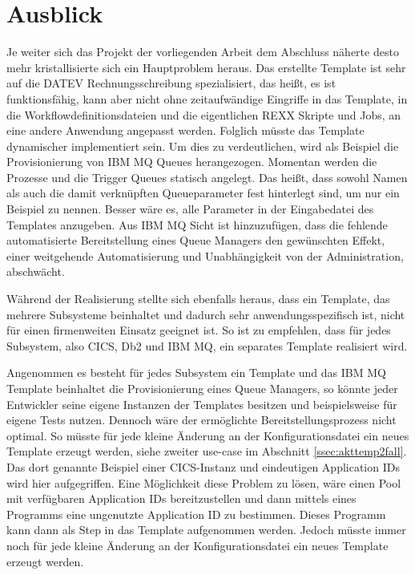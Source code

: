 \chapter{Ausblick}\label{ch:ausblick}
Je weiter sich das Projekt der vorliegenden Arbeit dem Abschluss näherte desto mehr kristallisierte sich ein Hauptproblem heraus.
Das erstellte Template ist sehr auf die DATEV Rechnungsschreibung spezialisiert, das heißt, es ist funktionsfähig, kann aber nicht ohne zeitaufwändige Eingriffe in das Template, in die Workflowdefinitionsdateien und die eigentlichen REXX Skripte und Jobs, an eine andere Anwendung angepasst werden. 
Folglich müsste das Template dynamischer implementiert sein.
Um dies zu verdeutlichen, wird als Beispiel die Provisionierung von IBM MQ Queues herangezogen.
Momentan werden die Prozesse und die Trigger Queues  statisch angelegt.
Das heißt, dass sowohl Namen als auch die damit verknüpften Queueparameter fest hinterlegt sind, um nur ein Beispiel zu nennen.
Besser wäre es, alle Parameter in der Eingabedatei des Templates anzugeben.
Aus IBM MQ Sicht ist hinzuzufügen, dass die fehlende automatisierte Bereitstellung eines Queue Managers den gewünschten Effekt, einer weitgehende Automatisierung und Unabhängigkeit von der Administration, abschwächt.

Während der Realisierung stellte sich ebenfalls heraus, dass ein Template, das mehrere Subsysteme beinhaltet und dadurch sehr anwendungsspezifisch ist, nicht für einen firmenweiten Einsatz geeignet ist.
So ist zu empfehlen, dass für jedes Subsystem, also CICS, Db2 und IBM MQ, ein separates Template realisiert wird.

Angenommen es besteht für jedes Subsystem ein Template und das IBM MQ Template beinhaltet die Provisionierung eines Queue Managers, so könnte jeder Entwickler seine eigene Instanzen der Templates besitzen und beispielsweise für eigene Tests nutzen.
Dennoch wäre der ermöglichte Bereitstellungsprozess nicht optimal.
So müsste für jede kleine Änderung an der Konfigurationsdatei ein neues Template erzeugt werden, siehe zweiter use-case im Abschnitt \ref{ssec:akttemp2fall}.
Das dort genannte Beispiel einer CICS-Instanz und eindeutigen Application IDs wird hier aufgegriffen.
Eine Möglichkeit diese Problem zu lösen, wäre einen Pool mit verfügbaren Application IDs bereitzustellen und dann mittels eines Programms eine ungenutzte Application ID zu bestimmen.
Dieses Programm kann dann als Step in das Template aufgenommen werden.
Jedoch müsste immer noch für jede kleine Änderung an der Konfigurationsdatei ein neues Template erzeugt werden.

